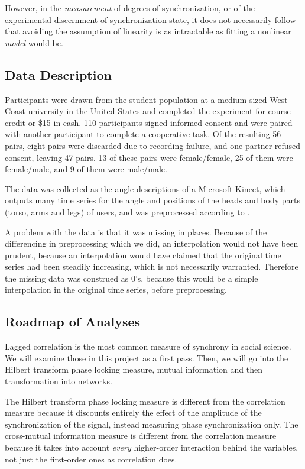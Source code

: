 \documentclass[12pt]{article}
\begin{document}
However, in the \emph{measurement} of degrees of synchronization, or of the experimental discernment of synchronization state, it does not necessarily follow that avoiding the assumption of linearity is as intractable as fitting a nonlinear \emph{model} would be.

\subsection{Data Description}

Participants were drawn from the student population at a medium sized West Coast university in the United States and completed the experiment for course credit or \$15 in cash. 110 participants signed informed consent and were paired with another participant to complete a cooperative task.  Of the resulting 56 pairs, eight pairs were discarded due to recording failure, and one partner refused consent, leaving 47 pairs. 13 of these pairs were female/female, 25 of them were female/male, and 9 of them were male/male.

The data was collected as the angle descriptions of a Microsoft Kinect, which outputs many time series for the angle and positions of the heads and body parts (torso, arms and legs) of users, and was preprocessed according to \cite{andrea}.

A problem with the data is that it was missing in places. Because of the differencing in preprocessing which we did, an interpolation would not have been prudent, because an interpolation would have claimed that the original time series had been steadily increasing, which is not necessarily warranted. Therefore the missing data was construed as 0's, because this would be a simple interpolation in the original time series, before preprocessing.

\subsection{Roadmap of Analyses}

Lagged correlation is the most common measure of synchrony in social science. We will examine those in this project as a first pass. Then, we will go into the Hilbert transform phase locking measure, mutual information and then transformation into networks. %

The Hilbert transform phase locking measure is different from the correlation measure because it discounts entirely the effect of the amplitude of the synchronization of the signal, instead measuring phase synchronization only. The cross-mutual information measure is different from the correlation measure because it takes into account \emph{every} higher-order interaction behind the variables, not just the first-order ones as correlation does. %
\end{document}
